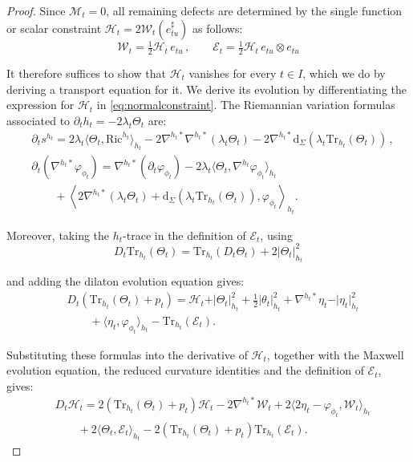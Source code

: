 \documentclass[10pt,reqno,a4paper]{amsart}
\theoremstyle{plain}
\theoremstyle{definition}
\theoremstyle{remark}
\theoremstyle{remark}
\def\dd{\mathrm{d}}
\newcommand{\Tr}{\mathrm{Tr}}
\def\cH{\mathcal{H}}
\def\cE{\mathcal{E}}
\def\cM{\mathcal{M}}
\def\cW{\mathcal{W}}
\def\cH{\mathcal{H}}
\newcommand{\Ric}{\mathrm{Ric}}
\renewcommand{\(}{ (}
\renewcommand{\)}{ )}
\begin{document}
\begin{proof}
\noindent
Since $\cM_t = 0$, all remaining defects are determined by the single function or scalar constraint  $\cH_t = 2\cW_t(e_{tu}^{\sharp})$ as follows:
\begin{equation*}
\mathcal{W}_t = \tfrac12 \cH_t\, e_{tu}\, , \qquad \cE_t = \tfrac12 \cH_t\, e_{tu} \otimes e_{tu}    
\end{equation*}

\noindent
It therefore suffices to show that $\cH_t$ vanishes for every $t \in I$, which we do by deriving a transport equation for it. We derive its evolution by differentiating the expression for $\cH_t$ in \eqref{eq:normalconstraint}. The Riemannian variation formulas associated to
$\partial_t h_t=-2\lambda_t\Theta_t$ are:
\begin{eqnarray*}
& \partial_t s^{h_t}
=2\lambda_t\langle\Theta_t,\Ric^{h_t}\rangle_{h_t}
-2\nabla^{h_t\ast}\nabla^{h_t\ast}(\lambda_t\Theta_t)
-2\nabla^{h_t\ast}
\dd_{\Sigma} (\lambda_t\Tr_{h_t}(\Theta_t) )\, ,\\
& \partial_t(\nabla^{h_t\ast}\varphi_{\phi_t})
=\nabla^{h_t\ast}(\partial_t\varphi_{\phi_t})
-2\lambda_t
\langle\Theta_t,\nabla^{h_t}\varphi_{\phi_t}\rangle_{h_t}\\
& \qquad
+\left\langle
2\nabla^{h_t\ast}(\lambda_t\Theta_t)
+\dd_{\Sigma} (\lambda_t\Tr_{h_t}(\Theta_t) ),
\varphi_{\phi_t}
\right\rangle_{h_t}.
\end{eqnarray*}

\noindent
Moreover, taking the $h_t$-trace in the definition of $\cE_t$, using
\begin{equation*}
D_t\Tr_{h_t}(\Theta_t)
=\Tr_{h_t}(D_t\Theta_t)+2\vert\Theta_t\vert_{h_t}^2
\end{equation*}

\noindent
and adding the dilaton evolution equation gives:
\begin{eqnarray*}
& D_t (\Tr_{h_t}(\Theta_t)+p_t )
=\cH_t+\vert\Theta_t\vert_{h_t}^2
+\frac{1}{2}\vert\theta_t\vert_{h_t}^2
+\nabla^{h_t\ast}\eta_t-\vert\eta_t\vert_{h_t}^2\\
& \qquad
+\langle\eta_t,\varphi_{\phi_t}\rangle_{h_t}
-\Tr_{h_t}(\cE_t).
\end{eqnarray*}

\noindent
Substituting these formulas into the derivative of $\cH_t$, together with the Maxwell evolution equation, the reduced curvature identities and the definition of $\cE_t$, gives:
\begin{eqnarray*}
& D_t\cH_t
=2 (\Tr_{h_t}(\Theta_t)+p_t )\cH_t
-2\nabla^{h_t\ast}\cW_t
+2\langle2\eta_t-\varphi_{\phi_t},\cW_t\rangle_{h_t}\\
& \qquad
+2\langle\Theta_t,\cE_t\rangle_{h_t}
-2 (\Tr_{h_t}(\Theta_t)+p_t )
\Tr_{h_t}(\cE_t).
\end{eqnarray*}


\end{proof}
\end{document}

